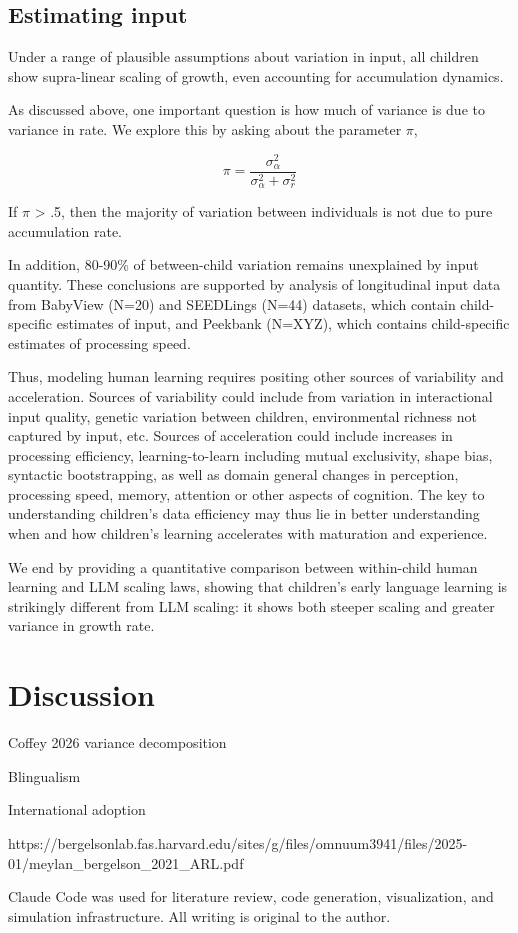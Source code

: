 \documentclass[
]{pnas-new}
\begin{document}
\subsection{Estimating input}\label{estimating-input}

Under a range of plausible assumptions about variation in input, all
children show supra-linear scaling of growth, even accounting for
accumulation dynamics.

As discussed above, one important question is how much of variance is
due to variance in rate. We explore this by asking about the parameter
\(\pi\),

\[\pi = \frac{\sigma_\alpha^2}{\sigma_\alpha^2 + \sigma_r^2}\]

If \(\pi\) \textgreater{} .5, then the majority of variation between
individuals is not due to pure accumulation rate.

In addition, 80-90\% of between-child variation remains unexplained by
input quantity. These conclusions are supported by analysis of
longitudinal input data from BabyView (N=20) and SEEDLings (N=44)
datasets, which contain child-specific estimates of input, and Peekbank
(N=XYZ), which contains child-specific estimates of processing speed.

Thus, modeling human learning requires positing other sources of
variability and acceleration. Sources of variability could include from
variation in interactional input quality, genetic variation between
children, environmental richness not captured by input, etc. Sources of
acceleration could include increases in processing efficiency,
learning-to-learn including mutual exclusivity, shape bias, syntactic
bootstrapping, as well as domain general changes in perception,
processing speed, memory, attention or other aspects of cognition. The
key to understanding children's data efficiency may thus lie in better
understanding when and how children's learning accelerates with
maturation and experience.

We end by providing a quantitative comparison between within-child human
learning and LLM scaling laws, showing that children's early language
learning is strikingly different from LLM scaling: it shows both steeper
scaling and greater variance in growth rate.

\section{Discussion}\label{discussion}

Coffey 2026 variance decomposition

Blingualism

International adoption

https://bergelsonlab.fas.harvard.edu/sites/g/files/omnuum3941/files/2025-01/meylan\_bergelson\_2021\_ARL.pdf

Claude Code was used for literature review, code generation,
visualization, and simulation infrastructure. All writing is original to
the author.
\end{document}
